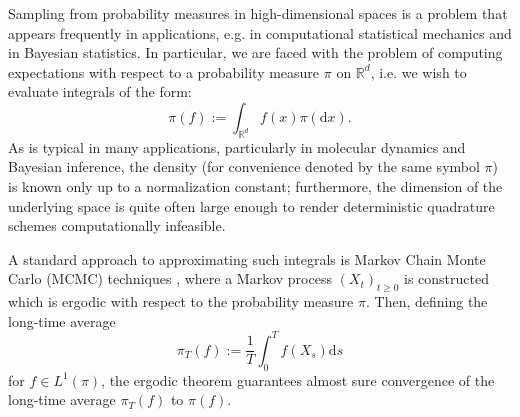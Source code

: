 
Sampling from probability measures in high-dimensional spaces is a problem that appears frequently in applications, e.g. in computational statistical mechanics and in Bayesian statistics. In particular, we are faced with the problem of computing expectations with respect to a probability measure $\pi$ on $\mathbb{R}^{d}$, i.e. we wish to evaluate integrals of the form:
\begin{equation}
\label{eq:expectation}
\pi(f):=\int_{\mathbb{R}^{d}}f(x)\pi(\mathrm{d}x).
\end{equation}
As is typical in many applications, particularly in molecular dynamics
and Bayesian inference, the density (for convenience denoted by the same symbol $\pi$) is known only up to a normalization constant; furthermore, the dimension of the underlying space is quite often large enough to render deterministic quadrature schemes computationally
infeasible. 

A standard approach to approximating such integrals is
Markov Chain Monte Carlo (MCMC) techniques \cite{GelmanCaStDuVeRu2014,liu2008monte,robert2013monte}, where a Markov process $(X_{t})_{t\geq0}$ is constructed which is ergodic with respect to the probability measure $\pi$. Then, defining the long-time average
\begin{equation}
\label{eq:estimator}
\pi_{T}(f):=\frac{1}{T}\int_{0}^{T}f(X_{s})\mathrm{d}s
\end{equation}
for $f\in L^{1}(\pi)$, the ergodic theorem guarantees almost sure
convergence of the long-time average $\pi_{T}(f)$ to $\pi(f)$.\\


